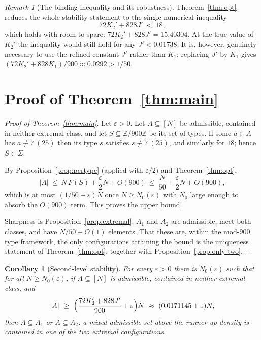 \documentclass[11pt,a4paper]{article}
\theoremstyle{plain}
\newtheorem{corollary}[theorem]{Corollary}
\theoremstyle{definition}
\theoremstyle{remark}
\newtheorem{remark}[theorem]{Remark}
\newcommand{\Z}{\mathbb{Z}}
\begin{document}
\begin{remark}[The binding inequality and its robustness]\label{rem:binding}
Theorem~\ref{thm:opt} reduces the whole stability statement to the single numerical inequality
\[
 72K_2'+828J'\ <\ 18 ,
\]
which holds with room to spare: $72K_2'+828J'=15.40304$. At the true value of $K_2'$ the inequality
would still hold for any $J'<0.01738$. It is, however, genuinely necessary to use the refined constant
$J'$ rather than $K_1$: replacing $J'$ by $K_1$ gives $(72K_2'+828K_1)/900\approx 0.0292>1/50$.
\end{remark}

\section{Proof of Theorem~\ref{thm:main}}\label{sec:proof}

\begin{proof}[Proof of Theorem~\ref{thm:main}]
Let $\varepsilon>0$. Let $A\subseteq[N]$ be admissible, contained in neither extremal class, and let
$S\subseteq\Z/900\Z$ be its set of types. If some $a\in A$ has $a\not\equiv 7\ (25)$ then its type
$s$ satisfies $s\not\equiv 7\ (25)$, and similarly for $18$; hence $S\in\Sigma$.

By Proposition~\ref{prop:pertype} (applied with $\varepsilon/2$) and Theorem~\ref{thm:opt},
\[
 |A|\ \le\ N\,F(S)+\frac{\varepsilon}{2}N+O(900)\ \le\ \frac{N}{50}+\frac{\varepsilon}{2}N+O(900),
\]
which is at most $(1/50+\varepsilon)N$ once $N\ge N_0(\varepsilon)$ with $N_0$ large enough to absorb
the $O(900)$ term. This proves the upper bound.

Sharpness is Proposition~\ref{prop:extremal}: $A_1$ and $A_2$ are admissible, meet both classes, and
have $N/50+O(1)$ elements. That these are, within the mod-$900$ type framework, the only configurations
attaining the bound is the uniqueness statement of Theorem~\ref{thm:opt}, together with
Proposition~\ref{prop:only-two}.
\end{proof}

\begin{corollary}[Second-level stability]\label{cor:second}
For every $\varepsilon>0$ there is $N_0(\varepsilon)$ such that for all $N\ge N_0(\varepsilon)$,
if $A\subseteq[N]$ is admissible, contained in neither extremal class, and
\[
 |A|\ \ge\ \Bigl(\frac{72K_2'+828J'}{900}+\varepsilon\Bigr)N\ \approx\ (0.0171145+\varepsilon)N,
\]
then $A\subseteq A_1$ or $A\subseteq A_2$: a mixed admissible set above the runner-up density is
contained in one of the two extremal configurations.
\end{corollary}
\end{document}

